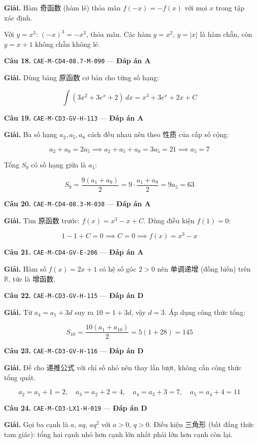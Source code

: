 \documentclass[11pt, a4paper]{article}
\begin{document}
\textbf{Giải.} Hàm 奇函数 (hàm lẻ) thỏa mãn $f(-x) = -f(x)$ với mọi $x$ trong tập xác định.

Với $y = x^3$: $(-x)^3 = -x^3$, thỏa mãn. Các hàm $y = x^2$, $y = \lvert x \rvert$ là hàm chẵn, còn $y = x + 1$ không chẵn không lẻ.

\textbf{Câu 18.} \texttt{CAE-M-CD4-08.7-M-090} — \textbf{Đáp án A}

\textbf{Giải.} Dùng bảng 原函数 cơ bản cho từng số hạng:

$$\int (3x^2 + 3e^x + 2)\,dx = x^3 + 3e^x + 2x + C$$

\textbf{Câu 19.} \texttt{CAE-M-CD3-GV-H-113} — \textbf{Đáp án A}

\textbf{Giải.} Ba số hạng $a_2, a_5, a_8$ cách đều nhau nên theo 性质 của cấp số cộng:

$$a_2 + a_8 = 2a_5 \implies a_2 + a_5 + a_8 = 3a_5 = 21 \implies a_5 = 7$$

Tổng $S_9$ có số hạng giữa là $a_5$:

$$S_9 = \frac{9(a_1 + a_9)}{2} = 9 \cdot \frac{a_1 + a_9}{2} = 9a_5 = 63$$

\textbf{Câu 20.} \texttt{CAE-M-CD4-08.3-M-038} — \textbf{Đáp án A}

\textbf{Giải.} Tìm 原函数 trước: $f(x) = x^3 - x + C$. Dùng điều kiện $f(1) = 0$:

$$1 - 1 + C = 0 \implies C = 0 \implies f(x) = x^3 - x$$

\textbf{Câu 21.} \texttt{CAE-M-CD4-GV-E-206} — \textbf{Đáp án A}

\textbf{Giải.} Hàm số $f(x) = 2x + 1$ có hệ số góc $2 > 0$ nên 单调递增 (đồng biến) trên $\mathbb{R}$, tức là 增函数.

\textbf{Câu 22.} \texttt{CAE-M-CD3-GV-H-115} — \textbf{Đáp án D}

\textbf{Giải.} Từ $a_4 = a_1 + 3d$ suy ra $10 = 1 + 3d$, vậy $d = 3$. Áp dụng công thức tổng:

$$S_{10} = \frac{10(a_1 + a_{10})}{2} = 5(1 + 28) = 145$$

\textbf{Câu 23.} \texttt{CAE-M-CD3-GV-H-116} — \textbf{Đáp án D}

\textbf{Giải.} Đề cho 递推公式 với chỉ số nhỏ nên thay lần lượt, không cần công thức tổng quát.

$$a_2 = a_1 + 1 = 2, \quad a_3 = a_2 + 2 = 4, \quad a_4 = a_3 + 3 = 7, \quad a_5 = a_4 + 4 = 11$$

\textbf{Câu 24.} \texttt{CAE-M-CD3-LX1-H-019} — \textbf{Đáp án D}

\textbf{Giải.} Gọi ba cạnh là $a$, $aq$, $aq^2$ với $a > 0$, $q > 0$. Điều kiện 三角形 (bất đẳng thức tam giác): tổng hai cạnh nhỏ hơn cạnh lớn nhất phải lớn hơn cạnh còn lại.
\end{document}
